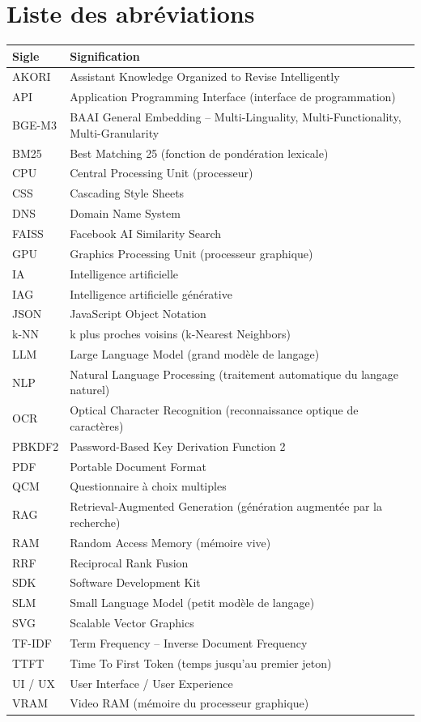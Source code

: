 \documentclass[12pt,a4paper,oneside]{report}
\begin{document}
\chapter*{Liste des abréviations}

\begin{longtable}{p{}p{}}
\toprule
\textbf{Sigle} & \textbf{Signification} \\ \midrule
\endhead
AKORI & Assistant Knowledge Organized to Revise Intelligently \\
API & Application Programming Interface (interface de programmation) \\
BGE-M3 & BAAI General Embedding -- Multi-Linguality, Multi-Functionality, Multi-Granularity \\
BM25 & Best Matching 25 (fonction de pondération lexicale) \\
CPU & Central Processing Unit (processeur) \\
CSS & Cascading Style Sheets \\
DNS & Domain Name System \\
FAISS & Facebook AI Similarity Search \\
GPU & Graphics Processing Unit (processeur graphique) \\
IA & Intelligence artificielle \\
IAG & Intelligence artificielle générative \\
JSON & JavaScript Object Notation \\
k-NN & k plus proches voisins (k-Nearest Neighbors) \\
LLM & Large Language Model (grand modèle de langage) \\
NLP & Natural Language Processing (traitement automatique du langage naturel) \\
OCR & Optical Character Recognition (reconnaissance optique de caractères) \\
PBKDF2 & Password-Based Key Derivation Function 2 \\
PDF & Portable Document Format \\
QCM & Questionnaire à choix multiples \\
RAG & Retrieval-Augmented Generation (génération augmentée par la recherche) \\
RAM & Random Access Memory (mémoire vive) \\
RRF & Reciprocal Rank Fusion \\
SDK & Software Development Kit \\
SLM & Small Language Model (petit modèle de langage) \\
SVG & Scalable Vector Graphics \\
TF-IDF & Term Frequency -- Inverse Document Frequency \\
TTFT & Time To First Token (temps jusqu'au premier jeton) \\
UI / UX & User Interface / User Experience \\
VRAM & Video RAM (mémoire du processeur graphique) \\
\bottomrule
\end{longtable}
\end{document}
